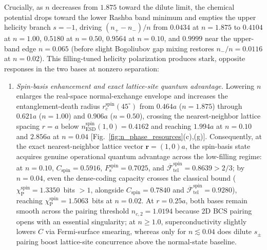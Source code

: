 \documentclass[aps,prb,twocolumn,superscriptaddress,longbibliography]{revtex4-2}
\begin{document}
Crucially, as $n$ decreases from $1.875$ toward the dilute limit, the
chemical potential drops toward the lower Rashba band minimum and empties
the upper helicity branch $s=-1$, driving $(n_+-n_-)/n$ from $0.0434$
at $n=1.875$ to $0.4104$ at $n=1.00$, $0.5180$ at $n=0.50$, $0.9564$ at
$n=0.10$, and $0.9999$ near the upper-band edge $n=0.065$ (before slight
Bogoliubov gap mixing restores $n_-/n=0.0116$ at $n=0.02$). This filling-tuned
helicity polarization produces stark, opposite responses in the two bases
at nonzero separation:
%
\begin{enumerate}
\item \emph{Spin-basis enhancement and exact lattice-site quantum advantage.}
Lowering $n$ enlarges the real-space normal-exchange envelope and
increases the entanglement-death radius $r_c^{\mathrm{spin}}(45^\circ)$
from $0.464a$ ($n=1.875$) through $0.621a$ ($n=1.00$) and $0.906a$
($n=0.50$), crossing the nearest-neighbor lattice spacing $r=a$ below
$n_{\mathrm{ESD}}^{\mathrm{spin}}(1,0)=0.4162$ and reaching $1.994a$ at
$n=0.10$ and $2.856a$ at $n=0.04$ [Fig.~\ref{fig:n_phase_resources}(c),(g)].
Consequently, at the exact nearest-neighbor lattice vector
$\mathbf{r}=(1,0)a$, the spin-basis state acquires genuine operational
quantum advantage across the low-filling regime: at $n=0.10$,
$C_{\mathrm{spin}}=0.5916$, $F_{\mathrm{s}}^{\mathrm{spin}}=0.7025$, and
$\overline{\mathcal{F}}_{\mathrm{tel}}^{\mathrm{spin}}=0.8639>2/3$; by
$n=0.04$, even the dense-coding capacity crosses the classical bound
($\chi_{\mathrm{P}}^{\mathrm{spin}}=1.3350$~bits $>1$, alongside
$C_{\mathrm{spin}}=0.7840$ and $\overline{\mathcal{F}}_{\mathrm{tel}}^{\mathrm{spin}}=0.9280$),
reaching $\chi_{\mathrm{P}}^{\mathrm{spin}}=1.5063$~bits at $n=0.02$.
At $r=0.25a$, both bases remain smooth across the pairing threshold
$n_{c,2}=1.0194$ because 2D BCS pairing opens with an essential singularity;
at $n\ge 1.0$, superconductivity slightly lowers $C$ via Fermi-surface
smearing, whereas only for $n\lesssim 0.04$ does dilute $s_{\pm}$ pairing
boost lattice-site concurrence above the normal-state baseline.


\end{enumerate}
\end{document}
